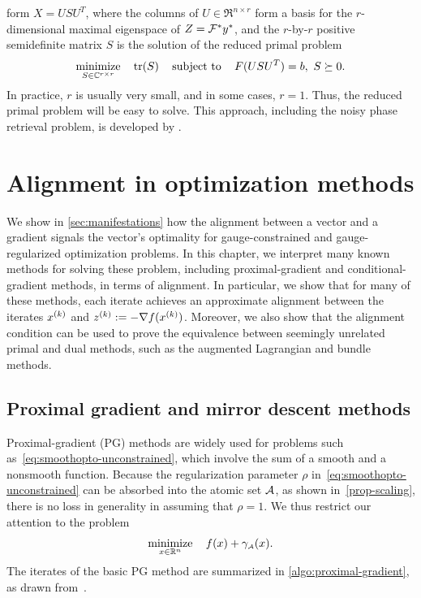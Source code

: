 \begin{example}
  form $X=USU^T$, where the columns of $U\in\Re^{n\times r}$ form a basis for
  the $r$-dimensional maximal eigenspace of $Z=\mathcal{F}^* y^*$, and the
  $r$-by-$r$ positive semidefinite matrix $S$ is the solution of the reduced
  primal problem 
  \begin{equation*} \label{eq:phaselift-recover}
    \displaystyle\mathop{\hbox{\rm minimize}}_{S \in \mathbb{C}^{r\times r}}\enspace\enspace \operatorname{tr}(S)
    \enspace\enspace\mathop{\hbox{\rm subject to}}\enspace\enspace F(USU^T) = b,\ S \succeq 0.
  \end{equation*}
  In practice, $r$ is usually very small, and in some cases, $r=1$. Thus, the
  reduced primal problem will be easy to solve. This approach, including the
  noisy phase retrieval problem, is developed by \citet{friedlander2016low}. 
\end{example}



\section{Alignment in optimization methods} \label{sec:methods}

We show in \autoref{sec:manifestations} how the alignment between a vector and a
gradient signals the vector's optimality for gauge-constrained and
gauge-regularized optimization problems. In this chapter, we interpret many
known methods for solving these problem, including proximal-gradient and
conditional-gradient methods, in terms of alignment. In particular, we show that
for many of these methods, each iterate achieves an approximate alignment
between the iterates $x^{(k)}$ and $z^{(k)} := -\nabla f(x^{(k)})$. Moreover, we also show
that the alignment condition can be used to prove the equivalence between
seemingly unrelated primal and dual methods, such as the augmented Lagrangian
and bundle methods.

\subsection{Proximal gradient and mirror descent methods}

Proximal-gradient (PG) methods \cite{parikh2013proximal,teb97} are widely used
for problems such as~\eqref{eq:smoothopto-unconstrained}, which involve the sum
of a smooth and a nonsmooth function. Because the regularization  parameter
$\rho$ in~\eqref{eq:smoothopto-unconstrained} can be absorbed into the atomic
set $\mathcal{A}$, as shown in~\autoref{prop-scaling}, there is no loss in generality in
assuming that $\rho = 1$. We thus restrict our attention to the problem
\begin{equation} \label{eq:PG-generic-problem}
   \displaystyle\mathop{\hbox{\rm minimize}}_{x\in\mathbb{R}^n}\enspace\enspace f(x) + \gamma_{\scriptscriptstyle\mathcal{A}}(x).
\end{equation}
The iterates of the basic PG method are summarized in
\autoref{algo:proximal-gradient}, as drawn
from~\citet[Section~4.2]{parikh2013proximal}.

